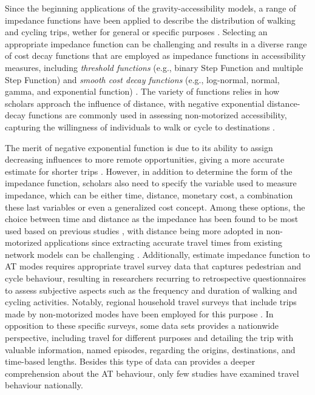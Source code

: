 \documentclass[preprint, 3p,
authoryear]{elsarticle} %
\begin{document}
Since the beginning applications of the gravity-accessibility models, a
range of impedance functions have been applied to describe the
distribution of walking and cycling trips, wether for general or
specific purposes
\citep{iacono2008access, iacono2010, larsen2010beyond, yang2012walking, millward2013active, vale2017influence, li2020approach}.
Selecting an appropriate impedance function can be challenging and
results in a diverse range of cost decay functions that are employed as
impedance functions in accessibility measures, including \emph{threshold
functions} (e.g., binary Step Function and multiple Step Function) and
\emph{smooth cost decay functions} (e.g., log-normal, normal, gamma, and
exponential function)
\citep{de2009exponential, reggiani2011accessibility, osth2016new, itf2017linking}.
The variety of functions relies in how scholars approach the influence
of distance, with negative exponential distance-decay functions are
commonly used in assessing non-motorized accessibility, capturing the
willingness of individuals to walk or cycle to destinations
\citep{handy1997measuring, geurs2001accessibility, iacono2010, vega2012using, millward2013active, vale2017influence, li2020approach}.

The merit of negative exponential function is due to its ability to
assign decreasing influences to more remote opportunities, giving a more
accurate estimate for shorter trips
\citep{iacono2010, kanafani1983transportation, fotheringham1989spatial}.
However, in addition to determine the form of the impedance function,
scholars also need to specify the variable used to measure impedance,
which can be either time, distance, monetary cost, a combination these
last variables or even a generalized cost concept. Among these options,
the choice between time and distance as the impedance has been found to
be most used based on previous studies
\citep{iacono2010, hull2012accessibility, sun2012measuring, lowry2012using, vasconcelos2012evaluation},
with distance being more adopted in non-motorized applications since
extracting accurate travel times from existing network models can be
challenging
\citep{handy1997measuring, iacono2010, yang2012walking, arranz2019measuring}.
Additionally, estimate impedance function to AT modes requires
appropriate travel survey data that captures pedestrian and cycle
behaviour, resulting in researchers recurring to retrospective
questionnaires to assess subjective aspects such as the frequency and
duration of walking and cycling activities. Notably, regional household
travel surveys that include trips made by non-motorized modes have been
employed for this purpose \citep{iacono2010, millward2013active}. In
opposition to these specific surveys, some data sets provides a
nationwide perspective, including travel for different purposes and
detailing the trip with valuable information, named episodes, regarding
the origins, destinations, and time-based lengths. Besides this type of
data can provides a deeper comprehension about the AT behaviour, only
few studies have examined travel behaviour nationally.
\end{document}
